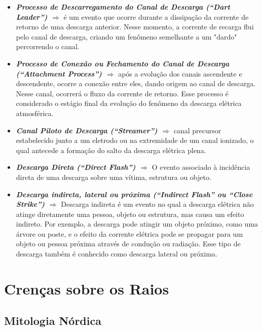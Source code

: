 \documentclass[a4paper, 12pt, onecolumn,singlespacing]{article}
\begin{document}
\begin{itemize}
		\item \textbf{\textit{Processo de Descarregamento do Canal de Descarga (``Dart Leader'') $\Rightarrow$ }} é um evento que ocorre durante a dissipação da corrente de retorno de uma descarga anterior. Nesse momento, a corrente de recarga flui pelo canal de descarga, criando um fenômeno semelhante a um "dardo" percorrendo o canal.
		
		\item \textbf{\textit{Processo de Conexão ou Fechamento do Canal de Descarga (``Attachment Process'') $\Rightarrow$ }}após a evolução dos canais ascendente e descendente, ocorre a conexão entre eles, dando origem ao canal de descarga. Nesse canal, ocorrerá o fluxo da corrente de retorno. Esse processo é considerado o estágio final da evolução do fenômeno da descarga elétrica atmosférica.
		
		\item \textbf{\textit{Canal Piloto de Descarga (``Streamer'') $\Rightarrow$ }}canal precursor estabelecido junto a um eletrodo ou na extremidade de um canal ionizado, o qual antecede a formação do salto da descarga elétrica plena.
		
		\item \textbf{\textit{Descarga Direta (``Direct Flash'') $\Rightarrow$ }}O evento associado à incidência direta de uma descarga sobre uma vítima, estrutura ou objeto.
		
		\item \textbf{\textit{Descarga indireta, lateral ou próxima (``Indirect Flash'' ou ``Close Strike'') $\Rightarrow$ }}Descarga indireta é um evento no qual a descarga elétrica não atinge diretamente uma pessoa, objeto ou estrutura, mas causa um efeito indireto. Por exemplo, a descarga pode atingir um objeto próximo, como uma árvore ou poste, e o efeito da corrente elétrica pode se propagar para um objeto ou pessoa próxima através de condução ou radiação. Esse tipo de descarga também é conhecido como descarga lateral ou próxima.
	\end{itemize}
	

	\section{Crenças sobre os Raios}
	
	\subsection{Mitologia Nórdica}
	
\end{document}
